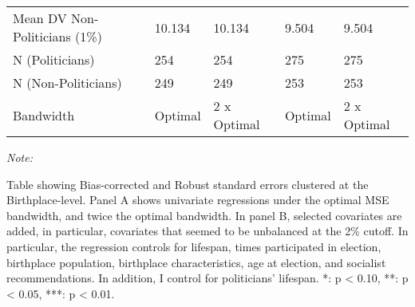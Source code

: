 \begin{table}[!h]
\begin{threeparttable}
\begin{tabular}[t]{lllll}
\hspace{1em}Mean DV Non-Politicians (1\%) & 10.134 & 10.134 & 9.504 & 9.504\\
\hspace{1em}N (Politicians) & 254 & 254 & 275 & 275\\
\hspace{1em}N (Non-Politicians) & 249 & 249 & 253 & 253\\
\hspace{1em}Bandwidth & Optimal & 2 x Optimal & Optimal & 2 x Optimal\\
\bottomrule
\end{tabular}
\begin{tablenotes}[para]
\item \textit{Note: } 
\item Table showing Bias-corrected and Robust standard errors clustered at the Birthplace-level. Panel A shows univariate regressions under the optimal MSE bandwidth, and twice the optimal bandwidth. In panel B, selected covariates are added, in particular, covariates that seemed to be unbalanced at the 2\% cutoff. In particular, the regression controls for lifespan, times participated in election, birthplace population, birthplace characteristics, age at election, and socialist recommendations. In addition, I control for politicians' lifespan. *: p < 0.10, **: p < 0.05, ***: p < 0.01.
\end{tablenotes}
\end{threeparttable}
\end{table}
